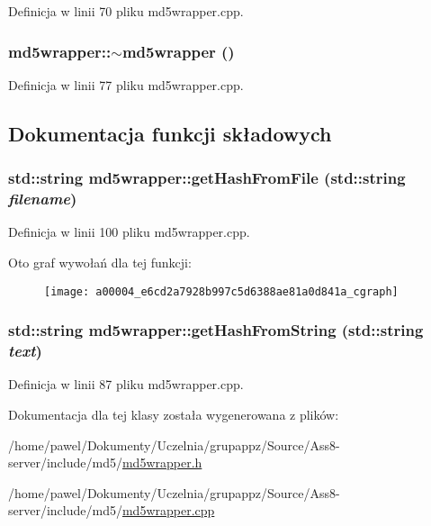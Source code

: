 Definicja w linii 70 pliku md5wrapper.cpp.\hypertarget{a00004_65e78258ad508d83be81d395f8bd43f4}{
\subsubsection[{$\sim$md5wrapper}]{\setlength{\rightskip}{0pt plus 5cm}md5wrapper::$\sim$md5wrapper ()}}
\label{a00004_65e78258ad508d83be81d395f8bd43f4}




Definicja w linii 77 pliku md5wrapper.cpp.

\subsection{Dokumentacja funkcji składowych}
\hypertarget{a00004_e6cd2a7928b997c5d6388ae81a0d841a}{
\subsubsection[{getHashFromFile}]{\setlength{\rightskip}{0pt plus 5cm}std::string md5wrapper::getHashFromFile (std::string {\em filename})}}
\label{a00004_e6cd2a7928b997c5d6388ae81a0d841a}




Definicja w linii 100 pliku md5wrapper.cpp.

Oto graf wywołań dla tej funkcji:\nopagebreak
\begin{figure}[H]
\begin{center}
\leavevmode
\texttt{[image: a00004\_e6cd2a7928b997c5d6388ae81a0d841a\_cgraph]}
\end{center}
\end{figure}
\hypertarget{a00004_225ba5a78228b867c3f17fdba959d8e6}{
\subsubsection[{getHashFromString}]{\setlength{\rightskip}{0pt plus 5cm}std::string md5wrapper::getHashFromString (std::string {\em text})}}
\label{a00004_225ba5a78228b867c3f17fdba959d8e6}




Definicja w linii 87 pliku md5wrapper.cpp.

Dokumentacja dla tej klasy została wygenerowana z plików:\begin{CompactItemize}
\item 
/home/pawel/Dokumenty/Uczelnia/grupappz/Source/Ass8-server/include/md5/\hyperlink{a00012}{md5wrapper.h}\item 
/home/pawel/Dokumenty/Uczelnia/grupappz/Source/Ass8-server/include/md5/\hyperlink{a00011}{md5wrapper.cpp}\end{CompactItemize}
